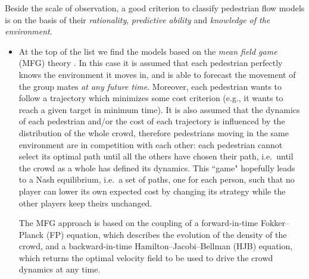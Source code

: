 \documentclass{cmslatex}
\begin{document}
Beside the scale of observation, a good criterion to classify pedestrian flow models is on the basis of their \textit{rationality}, \textit{predictive ability} and \textit{knowledge of the environment}.
\begin{itemize}[leftmargin=*]
\item At the top of the list we find the models based on the \textit{mean field game} (MFG) theory \cite{arjmand2021a, arjmand2021b, burger2014, dogbe2010, gueant2011, hoogendoorn2004, lachapelle2011}.  
	In this case it is assumed that each pedestrian perfectly knows the environment it moves in, and is able to forecast the movement of the group mates \textit{at any future time}. 
	Moreover, each pedestrian wants to follow a trajectory which minimizes some cost criterion (e.g., it wants to reach a given target in minimum time). It is also assumed that the dynamics of each pedestrian and/or the cost of each trajectory is influenced by the distribution of the whole crowd, therefore pedestrians moving in the same environment are in competition with each other: each pedestrian cannot select its optimal path until all the others have chosen their path, i.e.\ until the crowd as a whole has defined its dynamics. 
	This ``game" hopefully leads to a Nash equilibrium, i.e.\ a set of paths, one for each person, such that no player can lower its own expected cost by changing its strategy while the other players keep theirs unchanged.
	
	The MFG approach is based on the coupling of a forward-in-time Fokker--Planck (FP) equation, which describes the evolution of the density of the crowd, and a backward-in-time Hamilton--Jacobi--Bellman (HJB) equation, which returns the optimal velocity field to be used to drive the crowd dynamics at any time.
	

\end{itemize}
\end{document}
